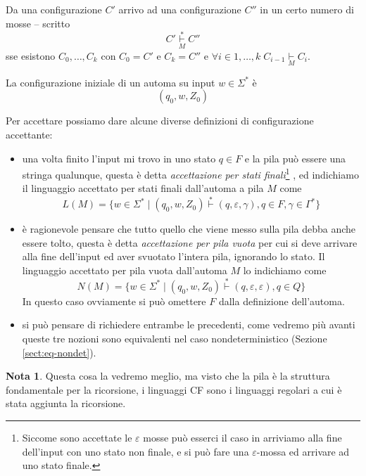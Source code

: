 \documentclass[12pt]{report}
\theoremstyle{definition}
\theoremstyle{regard}
\newtheorem{nota}{Nota}
\begin{document}
Da una configurazione $C'$ arrivo ad una configurazione $C''$ in un certo numero di mosse -- scritto 
$$ C' \underset{M}{\overset{*}{\vdash}} C'' $$
sse esistono $C_0, \dots, C_k$ con $C_0 = C'$ e $C_k = C''$ e $\forall i \in 1, \dots, k \; C_{i - 1} \underset{M}{\vdash} C_i$.

La configurazione iniziale di un automa su input $w \in \Sigma^*$ è 
$$ (q_0, w, Z_0) $$

Per accettare possiamo dare alcune diverse definizioni di configurazione accettante:
\begin{itemize}
	\item una volta finito l'input mi trovo in uno stato $q \in F$ e la pila può essere una stringa qualunque, questa è detta \textit{accettazione per stati finali}\footnote{Siccome sono accettate le $\varepsilon$ mosse può esserci il caso in arriviamo alla fine dell'input con uno stato non finale, e si può fare una $\varepsilon$-mossa ed arrivare ad uno stato finale.}
			, ed indichiamo il linguaggio accettato per stati finali dall'automa a pila $M$ come
		$$ L(M) = \{ w \in \Sigma^* \mid (q_0, w, Z_0) \overset{*}{\vdash} (q, \varepsilon, \gamma), q \in F, \gamma \in \Gamma^* \} $$
	\item è ragionevole pensare che tutto quello che viene messo sulla pila debba anche essere tolto, questa è detta \textit{accettazione per pila vuota} per cui si deve arrivare alla fine dell'input ed aver svuotato l'intera pila, ignorando lo stato.
		Il linguaggio accettato per pila vuota dall'automa $M$ lo indichiamo come
		$$ N(M) = \{ w \in \Sigma^* \mid (q_0, w, Z_0) \overset{*}{\vdash} (q, \varepsilon, \varepsilon), q \in Q \} $$
		In questo caso ovviamente si può omettere $F$ dalla definizione dell'automa.
	\item si può pensare di richiedere entrambe le precedenti, come vedremo più avanti queste tre nozioni sono equivalenti nel caso nondeterministico (Sezione \ref{sect:eq-nondet}).
\end{itemize}
\begin{nota} %
	Questa cosa la vedremo meglio, ma visto che la pila è la struttura fondamentale per la ricorsione, i linguaggi CF sono i linguaggi regolari a cui è stata aggiunta la ricorsione.
\end{nota}
\end{document}
